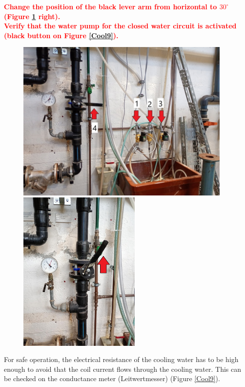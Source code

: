\documentclass[fleqn,a4paper,20pt]{article}
\begin{document}
\textcolor{red}{\textbf{Change the position of the black lever arm from horizontal to $30^\circ$ (Figure \ref{Cool2} right).}}\\

\textcolor{red}{\textbf{Verify that the water pump for the closed water circuit is activated (black button on Figure \ref{Cool9}).}}\\

\begin{figure}[!h]
	\centering
	\includegraphics[height=8cm]{Cool2}
	\includegraphics[height=8cm]{Cool5}
	\captionsetup{width=0.8\textwidth}
	\label{Cool2}
\end{figure}

\newpage

For safe operation, the electrical resistance of the cooling water has to be high enough to avoid that the coil current flows through the cooling water. This can be checked on the conductance meter (Leitwertmesser) (Figure \ref{Cool9}).\\
\end{document}
